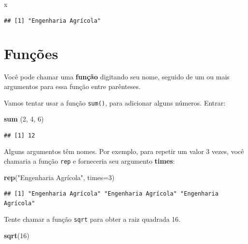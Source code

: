 \documentclass[
]{book}
\newenvironment{Shaded}{\begin{snugshade}}{\end{snugshade}}
\newcommand{\DataTypeTok}[1]{\textcolor[rgb]{0.13,0.29,0.53}{#1}}
\newcommand{\DecValTok}[1]{\textcolor[rgb]{0.00,0.00,0.81}{#1}}
\newcommand{\KeywordTok}[1]{\textcolor[rgb]{0.13,0.29,0.53}{\textbf{#1}}}
\newcommand{\NormalTok}[1]{#1}
\newcommand{\StringTok}[1]{\textcolor[rgb]{0.31,0.60,0.02}{#1}}
\begin{document}
\begin{Shaded}
\begin{Highlighting}[]
\NormalTok{x}
\end{Highlighting}
\end{Shaded}

\begin{verbatim}
## [1] "Engenharia Agrícola"
\end{verbatim}

\hypertarget{funuxe7uxf5es}{%
\section{Funções}\label{funuxe7uxf5es}}

Você pode chamar uma \textbf{função} digitando seu nome, seguido de um ou mais argumentos para essa função entre parênteses.

Vamos tentar usar a função \texttt{sum()}, para adicionar alguns números. Entrar:

\begin{Shaded}
\begin{Highlighting}[]
\KeywordTok{sum}\NormalTok{ (}\DecValTok{2}\NormalTok{, }\DecValTok{4}\NormalTok{, }\DecValTok{6}\NormalTok{)}
\end{Highlighting}
\end{Shaded}

\begin{verbatim}
## [1] 12
\end{verbatim}

Alguns argumentos têm nomes. Por exemplo, para repetir um valor 3 vezes, você chamaria a função \texttt{rep} e forneceria seu argumento \textbf{times}:

\begin{Shaded}
\begin{Highlighting}[]
\KeywordTok{rep}\NormalTok{(}\StringTok{"Engenharia Agrícola"}\NormalTok{, }\DataTypeTok{times=}\DecValTok{3}\NormalTok{)}
\end{Highlighting}
\end{Shaded}

\begin{verbatim}
## [1] "Engenharia Agrícola" "Engenharia Agrícola" "Engenharia Agrícola"
\end{verbatim}

Tente chamar a função \texttt{sqrt} para obter a raiz quadrada 16.

\begin{Shaded}
\begin{Highlighting}[]
\KeywordTok{sqrt}\NormalTok{(}\DecValTok{16}\NormalTok{)}
\end{Highlighting}
\end{Shaded}
\end{document}
